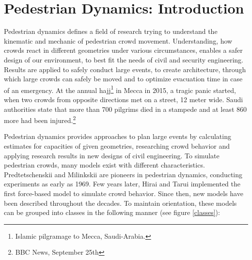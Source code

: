 \section{Pedestrian Dynamics: Introduction}

Pedestrian dynamics defines a field of research trying to understand the kinematic and mechanic of pedestrian crowd movement. Understanding, how crowds react in different geometries under various circumstances, enables a safer design of our environment, to best fit the needs of civil and security engineering. Results are applied to safely conduct large events, to create architecture, through which large crowds can safely be moved and to optimize evacuation time in case of an emergency. At the annual hajj\footnote{Islamic pilgramage to Mecca, Saudi-Arabia.} in Mecca in 2015, a tragic panic started, when two crowds from opposite directions met on a street, 12 meter wide. Saudi authorities state that more than 700 pilgrims died in a stampede and at least 860 more had been injured.\footnote{BBC News, September 25th}

Pedestrian dynamics provides approaches to plan large events by calculating estimates for capacities of given geometries, researching crowd behavior and applying research results in new designs of civil engineering.
To simulate pedestrian crowds, many models exist with different characteristics. Predtetschenskii and Milinkskii \citep{Predtechenskii1971} are pioneers in pedestrian dynamics, conducting experiments as early as 1969. Few years later, Hirai and Tarui \citep{Hirai1975} implemented the first force-based model to simulate crowd behavior. Since then, new models have been described throughout the decades. To maintain orientation, these models can be grouped into classes in the following manner (see figure \ref{classes}):

